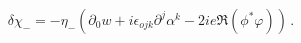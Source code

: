 \begin{equation}
\delta \chi_-=-\eta_- \left( \partial_0 w +i\epsilon_{ojk}
\partial^j \alpha^k -2i e \Re ( \phi^* \varphi ) \right) \,.
\label{delchim}
\end{equation}

